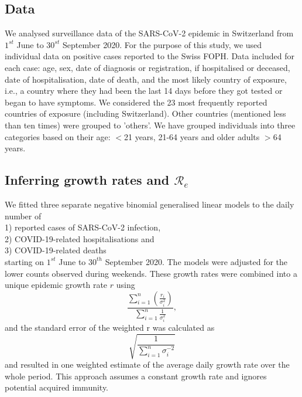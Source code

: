 \documentclass[10pt, a4paper, twoside]{article}
\begin{document}
\begin{multicols}{2}
\subsection{Data}
We analysed surveillance data of the SARS-CoV-2 epidemic in Switzerland from $1^{st}$ June to $30^{st}$ September 2020. 
For the purpose of this study, we used individual data on positive cases reported to the Swiss FOPH. 
Data included for each case: age, sex, date of diagnosis or registration, if hospitalised or deceased, date of hospitalisation, date of death, and the most likely country of exposure, i.e., a country where they had been the last 14 days before they got tested or began to have symptoms.
We considered the 23 most frequently reported countries of exposure (including Switzerland).
Other countries (mentioned less than ten times) were grouped to 'others'.
We have grouped individuals into three categories based on their age: $<$21 years, 21-64 years and older adults $>$64 years.


\subsection{Inferring growth rates and $\mathcal{R}_e$}
\label{marker}

We fitted three separate negative binomial generalised linear models to the daily number of
\\1) reported cases of SARS-CoV-2 infection,
\\2) COVID-19-related hospitalisations and
\\3) COVID-19-related deaths\\
starting on $1^{st}$ June to $30^{th}$ September 2020. 
The models were adjusted for the lower counts observed during weekends.
These growth rates were combined into a unique epidemic growth rate $r$ using
\[ \frac{ \sum_{i=1}^n ( \frac{ r_i}{\sigma_i^{2}} )}{  \sum_{i=1}^n \frac{1}{\sigma_i^{2}}}, \]
and the standard error of the weighted r was calculated as
\[ \sqrt{\frac{ 1 }{\sum_{i=1}^n \sigma_i^{-2}}}\]%
and resulted in one weighted estimate of the average daily growth rate over the whole period.
This approach assumes a constant growth rate and ignores potential acquired immunity.


\end{multicols}
\end{document}
